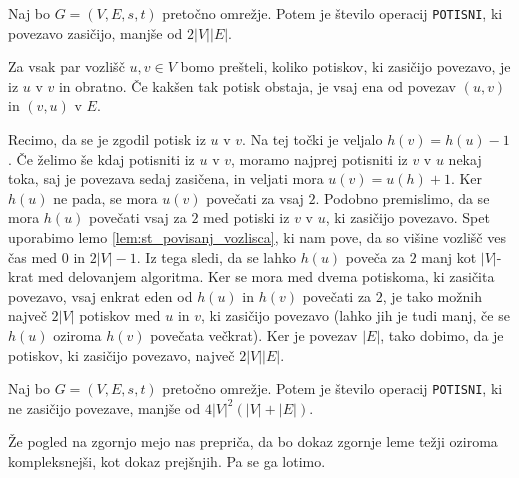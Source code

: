 \documentclass[mat1]{fmfdelo}
\begin{document}
\begin{lema}\label{lem:om_st_op_potisni_nas}
Naj bo $G=(V,E,s,t)$ pretočno omrežje. Potem je število operacij \texttt{POTISNI}, ki povezavo zasičijo, manjše od $2|V||E|$.
\end{lema}

\begin{dokaz}
Za vsak par vozlišč $u,v \in V$ bomo prešteli, koliko potiskov, ki zasičijo povezavo, je iz $u$ v $v$ in obratno. Če kakšen tak potisk obstaja, je vsaj ena od povezav $(u,v)$ in $(v,u)$ v $E$.

Recimo, da se je zgodil potisk iz $u$ v $v$. Na tej točki je veljalo $h(v) = h(u) - 1$. Če želimo še kdaj potisniti iz $u$ v $v$, moramo najprej potisniti iz $v$ v $u$ nekaj toka, saj je povezava sedaj zasičena, in veljati mora $u(v) = u(h) + 1$. Ker $h(u)$ ne pada, se mora $u(v)$ povečati za vsaj $2$. Podobno premislimo, da se mora $h(u)$ povečati vsaj za $2$ med potiski iz $v$ v $u$, ki zasičijo povezavo. Spet uporabimo lemo \ref{lem:st_povisanj_vozlisca}, ki nam pove, da so višine vozlišč ves čas med $0$ in $2|V|-1$. Iz tega sledi, da se lahko $h(u)$ poveča za $2$ manj kot $|V|$-krat med delovanjem algoritma. Ker se mora med dvema potiskoma, ki zasičita povezavo, vsaj enkrat eden od $h(u)$ in $h(v)$ povečati za $2$, je tako možnih največ $2|V|$ potiskov med $u$ in $v$, ki zasičijo povezavo (lahko jih je tudi manj, če se $h(u)$ oziroma $h(v)$ povečata večkrat). Ker je povezav $|E|$, tako dobimo, da je potiskov, ki zasičijo povezavo, največ $2|V||E|$.
\end{dokaz}

\begin{lema} \label{lem:om_st_op_potisni_nezas}
Naj bo $G=(V,E,s,t)$ pretočno omrežje. Potem je število operacij \texttt{POTISNI}, ki ne zasičijo povezave, manjše od $4|V|^2 (|V| + |E|)$.
\end{lema}

Že pogled na zgornjo mejo nas prepriča, da bo dokaz zgornje leme težji oziroma kompleksnejši, kot dokaz prejšnjih. Pa se ga lotimo.
\end{document}
